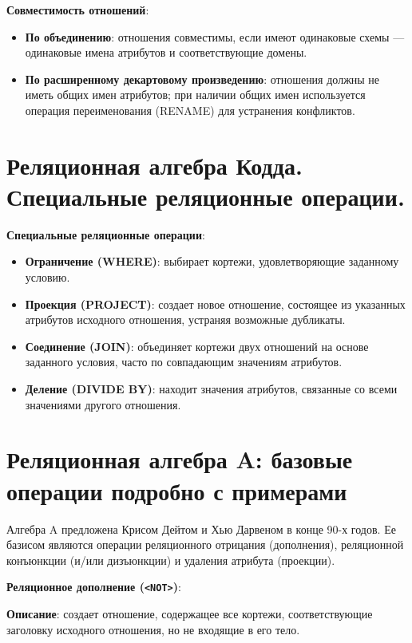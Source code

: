 \documentclass[a4paper,12pt]{article}
\begin{document}
\textbf{Совместимость отношений}:

\begin{itemize}
    \item \textbf{По объединению}: отношения совместимы, если имеют одинаковые схемы — одинаковые имена атрибутов и соответствующие домены.
    \item \textbf{По расширенному декартовому произведению}: отношения должны не иметь общих имен атрибутов; при наличии общих имен используется операция переименования (RENAME) для устранения конфликтов.
\end{itemize}

\section{Реляционная алгебра Кодда. Специальные реляционные операции.}

\textbf{Специальные реляционные операции}:

\begin{itemize}
    \item \textbf{Ограничение (WHERE)}: выбирает кортежи, удовлетворяющие заданному условию.
    \item \textbf{Проекция (PROJECT)}: создает новое отношение, состоящее из указанных атрибутов исходного отношения, устраняя возможные дубликаты.
    \item \textbf{Соединение (JOIN)}: объединяет кортежи двух отношений на основе заданного условия, часто по совпадающим значениям атрибутов.
    \item \textbf{Деление (DIVIDE BY)}: находит значения атрибутов, связанные со всеми значениями другого отношения.
\end{itemize}

\section{Реляционная алгебра A: базовые операции подробно с примерами}

Алгебра A предложена Крисом Дейтом и Хью Дарвеном в конце 90-х годов. Ее базисом являются операции реляционного отрицания (дополнения), реляционной конъюнкции (и/или дизъюнкции) и удаления атрибута (проекции).

\textbf{Реляционное дополнение (\texttt{<NOT>})}:

\textbf{Описание}: создает отношение, содержащее все кортежи, соответствующие заголовку исходного отношения, но не входящие в его тело.
\end{document}
